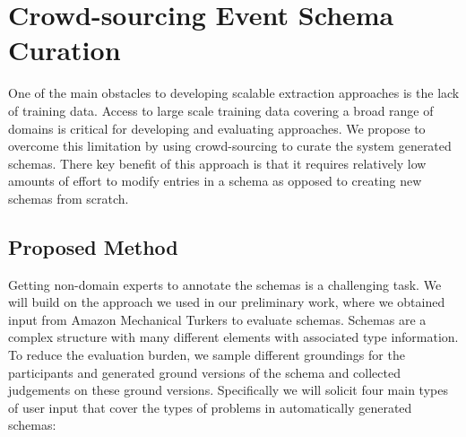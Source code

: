 \section{Crowd-sourcing Event Schema Curation}

One of the main obstacles to developing scalable extraction approaches is the lack of training data. Access to large scale training data covering a broad range of domains is critical for developing and evaluating approaches. We propose to overcome this limitation by using crowd-sourcing to curate the system generated schemas. There key benefit of this approach is that it requires relatively low amounts of effort to modify entries in a schema as opposed to creating new schemas from scratch. 

\subsection{Proposed Method}
Getting non-domain experts to annotate the schemas is a challenging task. We will build on the approach we used in our preliminary work, where we obtained input from Amazon Mechanical Turkers to evaluate schemas. Schemas are a complex structure with many different elements with associated type information. To reduce the evaluation burden, we sample different groundings for the participants and generated ground versions of the schema and collected judgements on these ground versions. Specifically we will solicit four main types of user input that cover the types of problems in automatically generated schemas:
